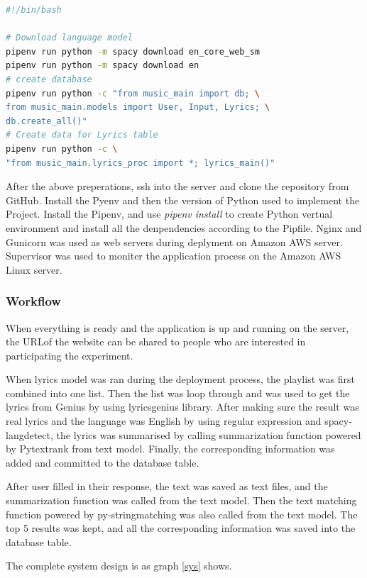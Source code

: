 \begin{lstlisting}[language=bash, label={lst:setup}, caption=setup.sh]
#!/bin/bash

# Download language model
pipenv run python -m spacy download en_core_web_sm
pipenv run python -m spacy download en
# create database
pipenv run python -c "from music_main import db; \
from music_main.models import User, Input, Lyrics; \
db.create_all()"
# Create data for Lyrics table
pipenv run python -c \
"from music_main.lyrics_proc import *; lyrics_main()"
\end{lstlisting}

After the above preperations, ssh into the server and clone the repository from
GitHub. Install the Pyenv and then the version of Python used to implement the
Project. Install the Pipenv, and use \emph{pipenv install} to create Python vertual
environment and install all the denpendencies according to the Pipfile. Nginx and
Gunicorn was used as web servers during deplyment on Amazon AWS server. Supervisor
was used to moniter the application process on the Amazon AWS Linux server.

\subsubsection{Workflow}

When everything is ready and the application is up and running on the server, the
URLof the website can be shared to people who are interested in participating the
experiment.

When lyrics model was ran during the deployment process, the playlist was first
combined into one list. Then the list was loop through and was used to get the
lyrics from Genius by using lyricsgenius library. After making sure the result
was real lyrics and the language was English by using regular expression and
spacy-langdetect, the lyrics was summarised by calling summarization function
powered by Pytextrank from text model. Finally, the corresponding information was
added and committed to the database table.

After user filled in their response, the text was saved as text files, and the
summarization function was called from the text model. Then the text matching
function powered by py-stringmatching was also called from the text model. The
top 5 results was kept, and all the corresponding information was saved into the
database table.

The complete system design is as graph \ref{sys} shows.

